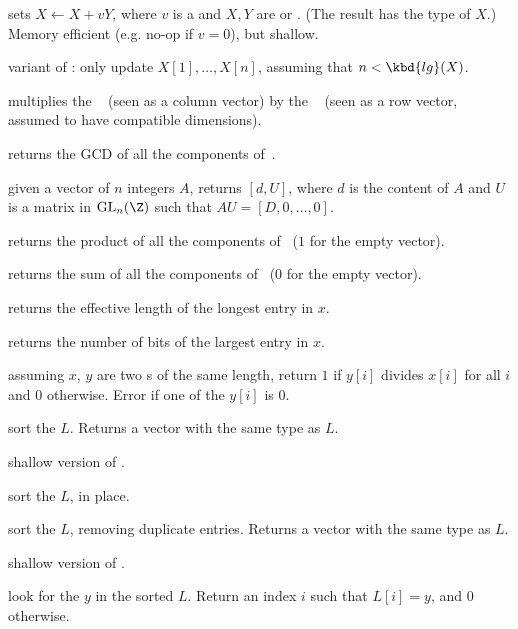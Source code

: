  sets $X\leftarrow X +
vY$, where $v$ is a  and $X,Y$ are  or . (The result
has the type of $X$.) Memory efficient (e.g. no-op if $v = 0$), but shallow.

variant of : only update $X[1], \dots, X[n]$,
assuming that $n < \kbd{lg}(X)$.

 multiplies the ~
(seen as a column vector) by the ~ (seen as a row vector,
assumed to have compatible dimensions).

 returns the GCD of all the components
of~.

 given a vector of $n$ integers $A$, returns $[d,
U]$, where $d$ is the content of $A$ and $U$ is a matrix
in $\text{GL}_n(\Z)$ such that $AU = [D,0, \dots,0]$.

 returns the product of all the components
of~ ($1$ for the empty vector).

 returns the sum of all the components
of~ ($0$ for the empty vector).

 returns the effective length of the longest
entry in $x$.

 returns the number of bits of the largest
entry in $x$.

 assuming $x$, $y$ are two s of the same
length, return $1$ if $y[i]$ divides $x[i]$ for all $i$ and $0$ otherwise.
Error if one of the $y[i]$ is $0$.

 sort the  $L$.
Returns a vector with the same type as $L$.

 shallow version of .

 sort the  $L$, in place.

 sort the  $L$, removing duplicate
entries. Returns a vector with the same type as $L$.

 shallow version of .

 look for the  $y$ in the sorted
 $L$. Return an index $i$ such that $L[i] = y$, and  $0$ otherwise.

